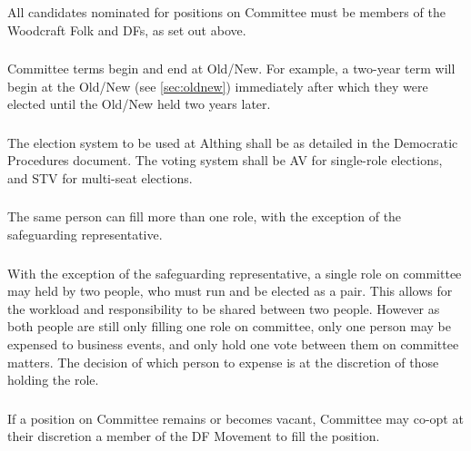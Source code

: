 \documentclass[a4paper, 11pt]{report}
\begin{document}
\subsubsection{}
All candidates nominated for positions on Committee must be members of the Woodcraft Folk and DFs, as set out above.

\subsubsection{}
Committee terms begin and end at Old/New.  For example, a two-year term will begin at the Old/New (see \ref{sec:oldnew}) immediately after which they were elected until the Old/New held two years later.

\subsubsection{}
The election system to be used at Althing shall be as detailed in the Democratic Procedures document.  The voting system shall be AV for single-role elections, and STV for multi-seat elections.

\subsubsection{}
\label{sec:moreroles}
The same person can fill more than one role, with the exception of the safeguarding representative.

\subsubsection{}
\label{sec:jobshares}
With the exception of the safeguarding representative, a single role on committee may held by two people, who must run and be elected as a pair. This allows for the workload and responsibility to be shared between two people. However as both people are still only filling one role on committee, only one person may be expensed to business events, and only hold one vote between them on committee matters. The decision of which person to expense is at the discretion of those holding the role.

\subsubsection{}
If a position on Committee remains or becomes vacant, Committee may co-opt at their discretion a member of the DF Movement to fill the position.
\end{document}
